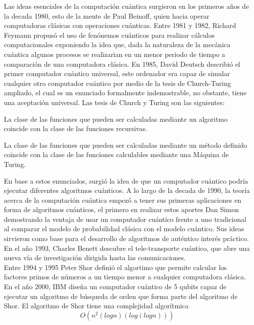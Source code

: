 Las ideas esenciales de la computación cuántica surgieron en los primeros años de la decada 1980, esto de la mente de Paul Beinoff, quien hacia operar computadoras clásicas
con operaciones cuánticas. Entre 1981 y 1982, Richard Feymann propusó el uso de fenónemos cuánticos para realizar cálculos computacionales exponiendo la idea que, dada la naturaleza
de la mecánica cuántica algunos procesos se realizarian en un menor periodo de tiempo a comparación de una computadora clásica. En 1985, David Deutsch describió el primer computador cuántico
universal, este ordenador era capaz de simular cualquier otro computador cuántico por medio de la tesis de Church-Turing ampliado, el cual es un enunciado formalmente indemostrable, no obstante, tiene una aceptación
universal. Las tesis de Church y Turing son las siguientes:
\begin{tesis}[de Church]
    La clase de las funciones que pueden ser calculadas mediante un algoritmo coincide con la clase de las funciones recursivas.
\end{tesis}
\begin{tesis}[de Turing]
    La clase de las funciones que pueden ser calculadas mediante un método definido coincide con la clase de las funciones calculables mediante una Máquina de Turing.
\end{tesis}
En base a estos enunciados, surgió la idea de que un computador cuántico podría ejecutar diferentes algoritmos cuánticos. A lo largo de la decada de 1990, la teoría acerca de la computación
cuántica empezó a tener sus primeras aplicaciones en forma de algoritmos cuánticos, el primero en realizar estos aportes Dan Simon demostrando la ventaja de usar un computador cuántico frente a uno tradicional
al comparar el modelo de probabilidad clásica con el modelo cuántico. Sus ideas sirvieron como base para el desarrollo de algoritmos de auténtico interés práctico. En el año 1993, Charles Benett descubre 
el tele-transporte cuántico, que abre una nueva vía de investigación dirigida hasta las comunicaciones.\\
Entre 1994 y 1995 Peter Shor definió el algortimo que permite calcular los factores primos de números a un tiempo menor a cualquier computadora clásica. En el año 2000, IBM diseña un computador cuántico de 5 qubits capaz de 
ejecutar un algoritmo de búsqueda de orden que forma parte del algoritmo de Shor. El algoritmo de Shor tiene una complejidad algorítmica \cite{Shor1997}
\begin{equation}
    O(n^2(logn)(log(logn)))
    \label{eq:compledidad_cuantica}
\end{equation}
